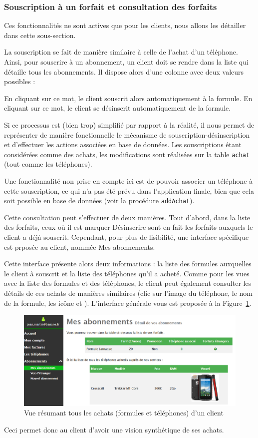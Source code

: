 \subsubsection{Souscription à un forfait et consultation des forfaits}
Ces fonctionnalités ne sont actives que pour les clients, nous allons les détailler dans cette sous-section.

La souscription se fait de manière similaire à celle de l'achat d'un téléphone. Ainsi, pour souscrire à un abonnement, un client doit se rendre dans la liste qui détaille tous les abonnements. Il dispose alors d'une colonne avec deux valeurs possibles :
\begin{itemize}
  En cliquant sur ce mot, le client souscrit alors automatiquement à la formule.
  En cliquant sur ce mot, le client se désinscrit automatiquement de la formule.
\end{itemize}
Si ce processus est (bien trop) simplifié par rapport à la réalité, il nous permet de représenter de manière fonctionnelle le mécanisme de souscription-désinscription et d'effectuer les actions associées en base de données. Les souscriptions étant considérées comme des achats, les modifications sont réalisées sur la table \texttt{achat} (tout comme les téléphones).

Une fonctionnalité non prise en compte ici est de pouvoir associer un téléphone à cette souscription, ce qui n'a pas été prévu dans l'application finale, bien que cela soit possible en base de données (voir la procédure \texttt{addAchat}).

Cette consultation peut s'effectuer de deux manières. Tout d'abord, dans la liste des forfaits, ceux où il est marquer \og Désinscrire\fg{} sont en fait les forfaits auxquels le client a déjà souscrit. Cependant, pour plus de lisibilité, une interface spécifique est prposée au client, nommée \og Mes abonnements\fg.

Cette interface présente alors deux informations : la liste des formules auxquelles le client à souscrit et la liste des téléphones qu'il a acheté. Comme pour les vues avec la liste des formules et des téléphones, le client peut également consulter les détails de ces achats de manières similaires (clic sur l'image du téléphone, le nom de la formule, les icône \faGlobe{} et \faMobilePhone). L'interface générale vous est proposée à la Figure~\ref{fig:liste-achats}.

\begin{figure}[ht]
  \centering
  \includegraphics[width=.7\textwidth]{images/Plateforme/liste_achats}
  \caption{Vue résumant tous les achats (formules et téléphones) d'un client}
  \label{fig:liste-achats}
\end{figure}

Ceci permet donc au client d'avoir une vision synthétique de ses achats.


